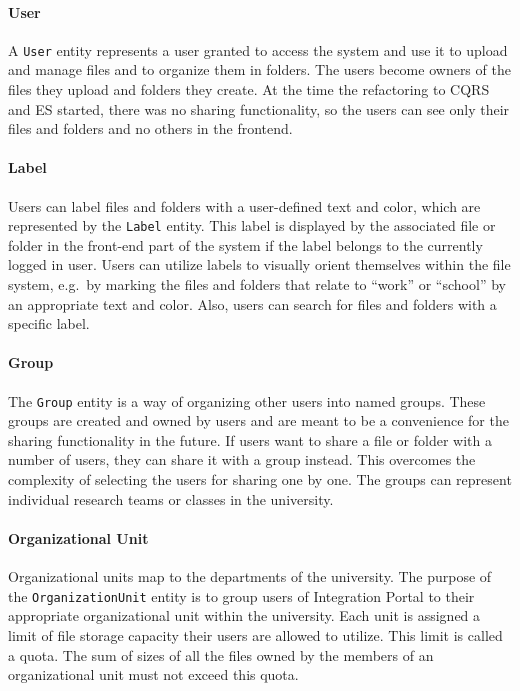 \documentclass{book}
\begin{document}
\paragraph{User}\label{user}

A \texttt{User} entity represents a user granted to access the system
and use it to upload and manage files and to organize them in folders.
The users become owners of the files they upload and folders they
create. At the time the refactoring to CQRS and ES started, there was no
sharing functionality, so the users can see only their files and folders
and no others in the frontend.

\paragraph{Label}\label{label}

Users can label files and folders with a user-defined text and color,
which are represented by the \texttt{Label} entity. This label is
displayed by the associated file or folder in the front-end part of the
system if the label belongs to the currently logged in user. Users can
utilize labels to visually orient themselves within the file system,
e.g.~by marking the files and folders that relate to ``work'' or
``school'' by an appropriate text and color. Also, users can search for
files and folders with a specific label.

\paragraph{Group}\label{group}

The \texttt{Group} entity is a way of organizing other users into named
groups. These groups are created and owned by users and are meant to be
a convenience for the sharing functionality in the future. If users want
to share a file or folder with a number of users, they can share it with
a group instead. This overcomes the complexity of selecting the users
for sharing one by one. The groups can represent individual research
teams or classes in the university.

\paragraph{Organizational Unit}\label{organizational-unit}

Organizational units map to the departments of the university. The
purpose of the \texttt{OrganizationUnit} entity is to group users of
Integration Portal to their appropriate organizational unit within the
university. Each unit is assigned a limit of file storage capacity their
users are allowed to utilize. This limit is called a quota. The sum of
sizes of all the files owned by the members of an organizational unit
must not exceed this quota.
\end{document}
